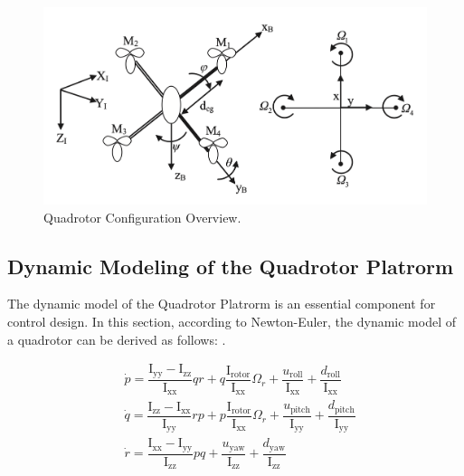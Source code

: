 \documentclass[3p,times]{elsarticle}
\begin{document}
\begin{figure}[H]
    \centering
    \includegraphics[width=12cm]{../Figure/schematic.png}
    \caption{Quadrotor Configuration Overview.}
    \label{fig:schematic}
\end{figure}

\subsection{Dynamic Modeling of the Quadrotor Platrorm}
The dynamic model of the Quadrotor Platrorm is an essential component for control design. In this section, according to Newton-Euler, the dynamic model of a quadrotor can be derived as follows: \cite{4399042, article_Bouabdallah}.



\begin{align}
    &\dot p = \dfrac{\mathrm{I}_{\text{yy}} - \mathrm{I}_{\text{zz}}}{\mathrm{I}_{\text{xx}}} qr + q \dfrac{\mathrm{I}_{\text{rotor}}}{\mathrm{I}_{\text{xx}}}\Omega_r + \dfrac{u_{\text{roll}}}{\mathrm{I}_{\text{xx}}} + \dfrac{d_{\text{roll}}}{\mathrm{I}_{\text{xx}}}
    \\
&\dot q = \dfrac{\mathrm{I}_{\text{zz}} - \mathrm{I}_{\text{xx}}}{\mathrm{I}_{\text{yy}}} rp + p \dfrac{\mathrm{I}_{\text{rotor}}}{\mathrm{I}_{\text{xx}}}\Omega_r + \dfrac{u_{\text{pitch}}}{\mathrm{I}_{\text{yy}}} + \dfrac{d_{\text{pitch}}}{\mathrm{I}_{\text{yy}}}
\\
&\dot r = \dfrac{\mathrm{I}_{\text{xx}} - \mathrm{I}_{\text{yy}}}{\mathrm{I}_{\text{zz}}} pq  +  \dfrac{u_{\text{yaw}}}{\mathrm{I}_{\text{zz}}} + \dfrac{d_{\text{yaw}}}{\mathrm{I}_{\text{zz}}}
\end{align}
\end{document}
